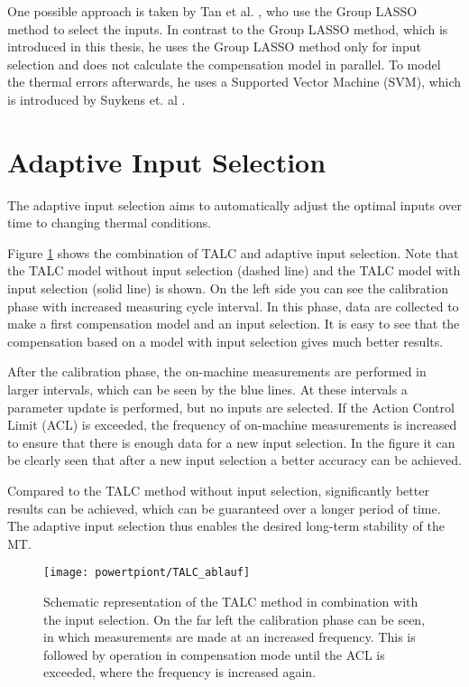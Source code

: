 One possible approach is taken by Tan et al. \cite{Tan_2017}, who use the Group LASSO method to select the inputs. In contrast to the Group LASSO method, which is introduced in this thesis, he uses the Group LASSO method only for input selection and does not calculate the compensation model in parallel. To model the thermal errors afterwards, he uses a Supported Vector Machine (SVM), which is introduced by Suykens et. al \cite{Suykens_2000}.


\section{Adaptive Input Selection}
\label{sec:Adaptiveinputselection}

The adaptive input selection aims to automatically adjust the optimal inputs over time to changing thermal conditions. 

Figure \ref{fig:TALC_ablauf} shows the combination of TALC and adaptive input selection. Note that the TALC model  without input selection (dashed line) and the TALC model with input selection (solid line) is shown. On the left side you can see the calibration phase with increased measuring cycle interval. In this phase, data are collected to make a first compensation model and an input selection. It is easy to see that the compensation based on a model with input selection gives much better results. 

After the calibration phase, the on-machine measurements are performed in larger intervals, which can be seen by the blue lines. At these intervals a parameter update is performed, but no inputs are selected. If the Action Control Limit (ACL) is exceeded, the frequency of on-machine measurements is increased to ensure that there is enough data for a new input selection. In the figure it can be clearly seen that after a new input selection a better accuracy can be achieved. 

Compared to the TALC method without input selection, significantly better results can be achieved, which can be guaranteed over a longer period of time. The adaptive input selection thus enables the desired long-term stability of the MT.


\begin{figure}[!htb]
    \centering
    \texttt{[image: powertpiont/TALC\_ablauf]} %
    \caption[Static vs. Adaptive Sensor set]{Schematic representation of the TALC method in combination with the input selection. On the far left the calibration phase can be seen, in which measurements are made at an increased frequency. This is followed by operation in compensation mode until the ACL is exceeded, where the frequency is increased again. \cite{Blaser_2017}}
    \label{fig:TALC_ablauf}
\end{figure}


